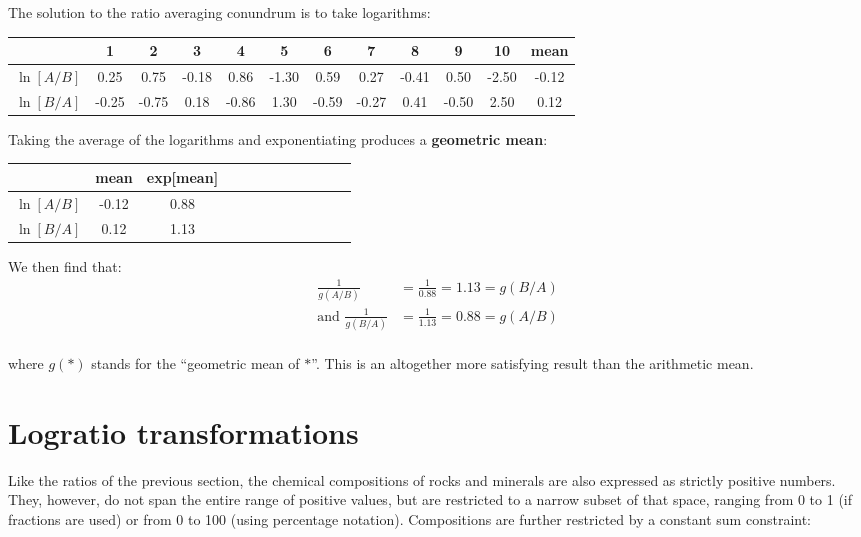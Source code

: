 The solution to the ratio averaging conundrum is to take logarithms:

\begin{center}
  \begin{tabular}{c|cccccccccc|c}
    & 1 & 2 & 3 & 4 & 5 & 6 & 7 & 8 & 9 & 10 & mean \\ \hline
    $\ln[A/B]$ & 0.25 & 0.75 & -0.18 & 0.86 & -1.30 &
    0.59 & 0.27 & -0.41 & 0.50 & -2.50 & -0.12 \\
    $\ln[B/A]$ & -0.25 & -0.75 & 0.18 & -0.86 & 1.30 &
    -0.59 & -0.27 & 0.41 & -0.50 & 2.50 & 0.12 \\
  \end{tabular}
\end{center}

Taking the average of the logarithms and exponentiating produces a
\textbf{geometric mean}:

\begin{center}
  \begin{tabular}{c|cccccccccc|c}
    &  mean & exp[mean] \\ \hline
    $\ln[A/B]$ & -0.12 & 0.88 \\
    $\ln[B/A]$ & 0.12 & 1.13 \\
  \end{tabular}
\end{center}

We then find that:
\[
\begin{split}
  \frac{1}{g(A/B)} & = \frac{1}{0.88} = 1.13 = g(B/A) \\
  \mbox{and~}\frac{1}{g(B/A)} & = \frac{1}{1.13} = 0.88 = g(A/B) \\
\end{split}
\]

\noindent where $g(\ast)$ stands for the ``geometric mean of $\ast$''.
This is an altogether more satisfying result than the arithmetic mean.

\section{Logratio transformations}
\label{sec:logratios}

Like the ratios of the previous section, the chemical compositions of
rocks and minerals are also expressed as strictly positive
numbers. They, however, do not span the entire range of positive
values, but are restricted to a narrow subset of that space, ranging
from 0 to 1 (if fractions are used) or from 0 to 100 (using percentage
notation).  Compositions are further restricted by a constant sum
constraint:

